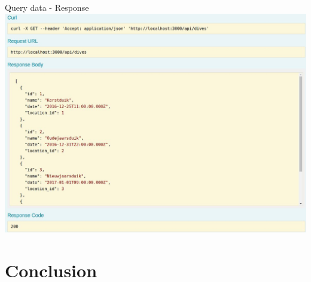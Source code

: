 \documentclass[11pt]{beamer}
\begin{document}
\begin{frame}{Query data - Response}
\includegraphics[width=\textwidth]{images/explorer-response.jpg} 
\end{frame}

\section{Conclusion}
\end{document}
